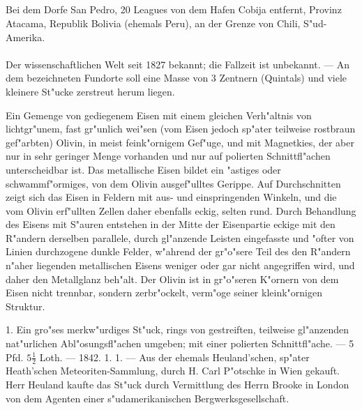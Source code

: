 \documentclass[a4paper, 11pt, oneside, polutonikogreek, german]{article}
\begin{document}
\subsection[\frakfamily{--- Meteoreisen --- Nr. 70 bis 94. --- Atacama.}]{}
\begin{center}

Bei dem Dorfe San Pedro, 20 Leagues von dem Hafen Cobija entfernt, Provinz Atacama, Republik Bolivia (ehemals Peru), an der Grenze von Chili, S"ud-Amerika.
\end{center}
\paragraph{}
Der wissenschaftlichen Welt seit 1827 bekannt; die Fallzeit ist unbekannt. --- An dem bezeichneten Fundorte soll eine Masse von 3 Zentnern (Quintals) und viele kleinere St"ucke zerstreut herum liegen.

Ein Gemenge von gediegenem Eisen mit einem gleichen Verh"altnis von lichtgr"unem, fast gr"unlich wei"sen (vom Eisen jedoch sp"ater teilweise rostbraun gef"arbten) Olivin, in meist feink"ornigem Gef"uge, und mit Magnetkies, der aber nur in sehr geringer Menge vorhanden und nur auf polierten Schnittfl"achen unterscheidbar ist. Das metallische Eisen bildet ein "astiges oder schwammf"ormiges, von dem Olivin ausgef"ulltes Gerippe. Auf Durchschnitten zeigt sich das Eisen in Feldern mit aus- und einspringenden Winkeln, und die vom Olivin erf"ullten Zellen daher ebenfalls eckig, selten rund. Durch Behandlung des Eisens mit S"auren entstehen in der Mitte der Eisenpartie eckige mit den R"andern derselben parallele, durch gl"anzende Leisten eingefasste und "ofter von Linien durchzogene dunkle Felder, w"ahrend der gr"o"sere Teil des den R"andern n"aher liegenden metallischen Eisens weniger oder gar nicht angegriffen wird, und daher den Metallglanz beh"alt. Der Olivin ist in gr"o"seren K"ornern von dem Eisen nicht trennbar, sondern zerbr"ockelt, verm"oge seiner kleink"ornigen Struktur.

1. Ein gro"ses merkw"urdiges St"uck, rings von gestreiften, teilweise gl"anzenden nat"urlichen Abl"osungsfl"achen umgeben; mit einer polierten Schnittfl"ache. --- 5 Pfd. $5\frac{1}{2}$ Loth. --- 1842. 1. 1. --- Aus der ehemals Heuland'schen, sp"ater Heath'schen Meteoriten-Sammlung, durch H. Carl P"otschke in Wien gekauft. Herr Heuland kaufte das St"uck durch Vermittlung des Herrn Brooke in London von dem Agenten einer s"udamerikanischen Bergwerksgesellschaft.
\end{document}
